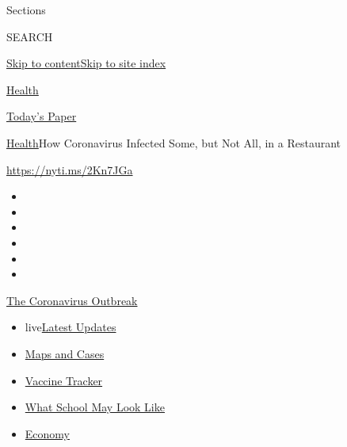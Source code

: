 Sections

SEARCH

\protect\hyperlink{site-content}{Skip to
content}\protect\hyperlink{site-index}{Skip to site index}

\href{https://www.nytimes.com/section/health}{Health}

\href{https://myaccount.nytimes.com/auth/login?response_type=cookie\&client_id=vi}{}

\href{https://www.nytimes.com/section/todayspaper}{Today's Paper}

\href{/section/health}{Health}\textbar{}How Coronavirus Infected Some,
but Not All, in a Restaurant

\url{https://nyti.ms/2Kn7JGa}

\begin{itemize}
\item
\item
\item
\item
\item
\item
\end{itemize}

\href{https://www.nytimes.com/news-event/coronavirus?action=click\&pgtype=Article\&state=default\&region=TOP_BANNER\&context=storylines_menu}{The
Coronavirus Outbreak}

\begin{itemize}
\tightlist
\item
  live\href{https://www.nytimes.com/2020/08/01/world/coronavirus-covid-19.html?action=click\&pgtype=Article\&state=default\&region=TOP_BANNER\&context=storylines_menu}{Latest
  Updates}
\item
  \href{https://www.nytimes.com/interactive/2020/us/coronavirus-us-cases.html?action=click\&pgtype=Article\&state=default\&region=TOP_BANNER\&context=storylines_menu}{Maps
  and Cases}
\item
  \href{https://www.nytimes.com/interactive/2020/science/coronavirus-vaccine-tracker.html?action=click\&pgtype=Article\&state=default\&region=TOP_BANNER\&context=storylines_menu}{Vaccine
  Tracker}
\item
  \href{https://www.nytimes.com/interactive/2020/07/29/us/schools-reopening-coronavirus.html?action=click\&pgtype=Article\&state=default\&region=TOP_BANNER\&context=storylines_menu}{What
  School May Look Like}
\item
  \href{https://www.nytimes.com/live/2020/07/31/business/stock-market-today-coronavirus?action=click\&pgtype=Article\&state=default\&region=TOP_BANNER\&context=storylines_menu}{Economy}
\end{itemize}


